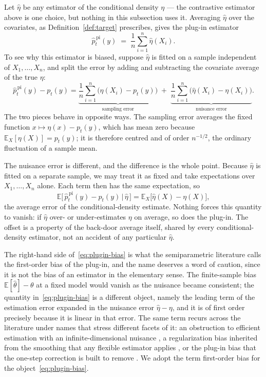 \documentclass[11pt]{article}
\theoremstyle{plain}
\theoremstyle{definition}
\theoremstyle{remark}
\newcommand{\pE}{\ensuremath{\mathbb{E}}}
\begin{document}
Let $\widehat\eta$ be any estimator of the conditional density $\eta$ --- the contrastive
estimator above is one choice, but nothing in this subsection uses it. Averaging
$\widehat\eta$ over the covariates, as Definition~\ref{def:target} prescribes, gives the
plug-in estimator
\begin{equation}
\widehat p^{\,\mathrm{pi}}_t(y)
\;=\; \frac{1}{n} \sum_{i=1}^{n} \widehat\eta(X_i).
\label{eq:plugin}
\end{equation}
To see why this estimator is biased, suppose $\widehat\eta$ is fitted on a sample independent
of $X_1,\dots,X_n$, and split the error by adding and subtracting the covariate average of the
true $\eta$:
\begin{equation}
\widehat p^{\,\mathrm{pi}}_t(y) - p_t(y)
= \underbrace{\frac1n \sum_{i=1}^n \big( \eta(X_i) - p_t(y) \big)}_{\text{sampling error}}
\;+\; \underbrace{\frac1n \sum_{i=1}^n \big( \widehat\eta(X_i) - \eta(X_i) \big)}_{\text{nuisance error}} .
\label{eq:plugin-decomp}
\end{equation}
The two pieces behave in opposite ways. The sampling error averages the fixed function
$x\mapsto\eta(x)-p_t(y)$, which has mean zero because $\pE_X[\eta(X)] = p_t(y)$; it is
therefore centred and of order $n^{-1/2}$, the ordinary fluctuation of a sample mean.

The nuisance error is different, and the difference is the whole point. Because
$\widehat\eta$ is fitted on a separate sample, we may treat it as fixed and take expectations
over $X_1,\dots,X_n$ alone. Each term then has the same expectation, so
\begin{equation}
\pE\Big[\, \widehat p^{\,\mathrm{pi}}_t(y) - p_t(y) \,\Big|\, \widehat\eta \,\Big]
= \pE_X\big[ \widehat\eta(X) - \eta(X) \big],
\label{eq:plugin-bias}
\end{equation}
the average error of the conditional-density estimate. Nothing forces this quantity to vanish:
if $\widehat\eta$ over- or under-estimates $\eta$ on average, so does the plug-in. The offset
is a property of the back-door average itself, shared by every conditional-density estimator,
not an accident of any particular $\widehat\eta$.

The right-hand side of~\eqref{eq:plugin-bias} is what the semiparametric literature calls the
first-order bias of the plug-in, and the name deserves a word of caution, since it is not the
bias of an estimator in the elementary sense. The finite-sample bias
$\pE[\widehat\theta]-\theta$ at a fixed model would vanish as the nuisance became consistent;
the quantity in~\eqref{eq:plugin-bias} is a different object, namely the leading term of the
estimation error expanded in the nuisance error $\widehat\eta-\eta$, and it is of first order
precisely because it is linear in that error. The same term recurs across the literature under
names that stress different facets of it: an obstruction to efficient estimation with an
infinite-dimensional nuisance \citep{bickel1988,robins2008}, a regularization bias inherited
from the smoothing that any flexible estimator applies \citep{chernozhukov2018}, or the plug-in
bias that the one-step correction is built to remove
\citep{vanderlaan2006tmle,kennedy2022review}. We adopt the term first-order bias for the
object~\eqref{eq:plugin-bias}.
\end{document}
